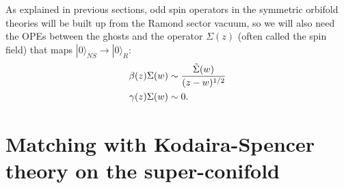 \documentclass[11pt]{amsart}
\theoremstyle{thm}
\numberwithin{equation}{subsection}
\theoremstyle{def}
\theoremstyle{rem}
\begin{document}
As explained in previous sections, odd spin operators in the symmetric orbifold theories will be built up from the Ramond sector vacuum, so we will also need the OPEs between the ghosts and the operator $\Sigma(z)$ (often called the spin field) that maps $|0\rangle_{NS} \rightarrow |0\rangle_{R}$:
\begin{align*}
\beta(z)\Sigma(w) &\sim {\tilde{\Sigma}(w) \over (z - w)^{1/2}}\\
\gamma(z)\Sigma(w) &\sim 0.
\end{align*}


\section{Matching with Kodaira-Spencer theory on the super-conifold}
\end{document}
